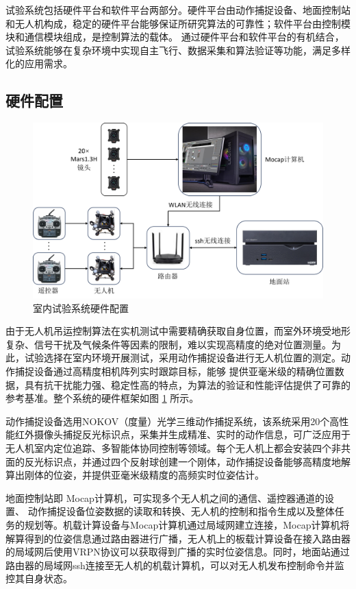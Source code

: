\documentclass[lang=chs, degree=master, blindreview=false, winfonts=true]{yanputhesis}
\begin{document}
试验系统包括硬件平台和软件平台两部分。硬件平台由动作捕捉设备、地面控制站和无人机构成，稳定的硬件平台能够保证所研究算法的可靠性；软件平台由控制模块和通信模块组成，是控制算法的载体。
通过硬件平台和软件平台的有机结合，试验系统能够在复杂环境中实现自主飞行、数据采集和算法验证等功能，满足多样化的应用需求。

\subsection{硬件配置}
\begin{figure}[hbt!]
	\centering
	\includegraphics[width=36pc]{picture/5_4.png} 
	\caption{室内试验系统硬件配置} 
	\label{framework}
\end{figure}
由于无人机吊运控制算法在实机测试中需要精确获取自身位置，而室外环境受地形复杂、信号干扰及气候条件等因素的限制，难以实现高精度的绝对位置测量。为此，试验选择在室内环境开展测试，采用动作捕捉设备进行无人机位置的测定。动作捕捉设备通过高精度相机阵列实时跟踪目标，能够
提供亚毫米级的精确位置数据，具有抗干扰能力强、稳定性高的特点，为算法的验证和性能评估提供了可靠的参考基准。整个系统的硬件框架如图 \ref{framework} 所示。


动作捕捉设备选用NOKOV（度量）光学三维动作捕捉系统，该系统采用20个高性能红外摄像头捕捉反光标识点，采集并生成精准、实时的动作信息，可广泛应用于无人机室内定位追踪、多智能体协同控制等领域。每个无人机上都会安装四个非共面的反光标识点，并通过四个反射球创建一个刚体，动作捕捉设备能够高精度地解算出刚体的位姿，并提供亚毫米级精度的高频实时位姿估计。

地面控制站即 Mocap计算机，可实现多个无人机之间的通信、遥控器通道的设置、 动作捕捉设备位姿数据的读取和转换、无人机的控制和指令生成以及整体任务的规划等。机载计算设备与Mocap计算机通过局域网建立连接，Mocap计算机将解算得到的位姿信息通过路由器进行广播，无人机上的板载计算设备在接入路由器的局域网后使用VRPN协议可以获取得到广播的实时位姿信息。同时，地面站通过路由器的局域网ssh连接至无人机的机载计算机，可以对无人机发布控制命令并监控其自身状态。
\end{document}

